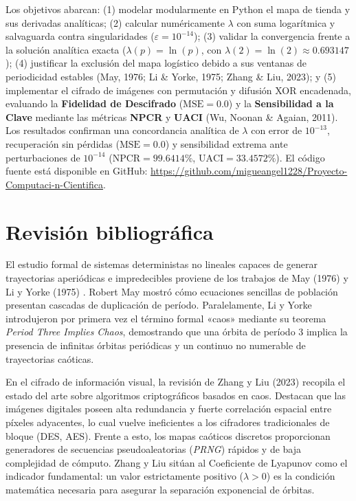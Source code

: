 \documentclass[11pt,letterpaper]{article}
\begin{document}
Los objetivos abarcan: (1) modelar modularmente en Python el mapa de tienda y sus derivadas analíticas; (2) calcular numéricamente $\lambda$ con suma logarítmica y salvaguarda contra singularidades ($\varepsilon = 10^{-14}$); (3) validar la convergencia frente a la solución analítica exacta ($\lambda(p) = \ln(p)$, con $\lambda(2) = \ln(2) \approx 0.693147$); (4) justificar la exclusión del mapa logístico debido a sus ventanas de periodicidad estables (May, 1976; Li \& Yorke, 1975; Zhang \& Liu, 2023); y (5) implementar el cifrado de imágenes con permutación y difusión XOR encadenada, evaluando la \textbf{Fidelidad de Descifrado} ($\text{MSE} = 0.0$) y la \textbf{Sensibilidad a la Clave} mediante las métricas \textbf{NPCR} y \textbf{UACI} (Wu, Noonan \& Agaian, 2011). Los resultados confirman una concordancia analítica de $\lambda$ con error de $10^{-13}$, recuperación sin pérdidas ($\text{MSE} = 0.0$) y sensibilidad extrema ante perturbaciones de $10^{-14}$ ($\text{NPCR} = 99.6414\%$, $\text{UACI} = 33.4572\%$). El código fuente está disponible en GitHub: \url{https://github.com/migueangel1228/Proyecto-Computaci-n-Cientifica}.

\section{Revisión bibliográfica}
El estudio formal de sistemas deterministas no lineales capaces de generar trayectorias aperiódicas e impredecibles proviene de los trabajos de May (1976) \cite{may1976} y Li y Yorke (1975) \cite{li1975}. Robert May mostró cómo ecuaciones sencillas de población presentan cascadas de duplicación de período. Paralelamente, Li y Yorke introdujeron por primera vez el término formal «caos» mediante su teorema \textit{Period Three Implies Chaos}, demostrando que una órbita de período 3 implica la presencia de infinitas órbitas periódicas y un continuo no numerable de trayectorias caóticas.

En el cifrado de información visual, la revisión de Zhang y Liu (2023) \cite{zhang2023} recopila el estado del arte sobre algoritmos criptográficos basados en caos. Destacan que las imágenes digitales poseen alta redundancia y fuerte correlación espacial entre píxeles adyacentes, lo cual vuelve ineficientes a los cifradores tradicionales de bloque (DES, AES). Frente a esto, los mapas caóticos discretos proporcionan generadores de secuencias pseudoaleatorias (\textit{PRNG}) rápidos y de baja complejidad de cómputo. Zhang y Liu sitúan al Coeficiente de Lyapunov como el indicador fundamental: un valor estrictamente positivo ($\lambda > 0$) es la condición matemática necesaria para asegurar la separación exponencial de órbitas.
\end{document}
